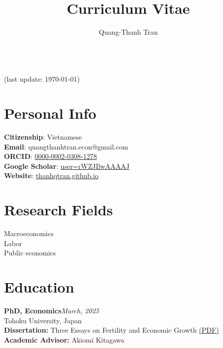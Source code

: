 \documentclass[12pt]{article}
\newcommand{\cvcolor}{\color{DodgerBlue4}} %
\renewcommand{\maketitle}{
\begin{center}
{\Huge\theauthor}\\
{\color{Gray}(last update: \today)}
\end{center}
}
\begin{document}
\title{Curriculum Vitae} %
\author{Quang-Thanh Tran}

\maketitle


\section{Personal Info}
\textbf{Citizenship}: Vietnamese \\
\textbf{Email}: quangthanhtran.econ@gmail.com \\
\textbf{ORCID}: \href{https://orcid.org/0000-0002-0308-1278}{0000-0002-0308-1278}\\
\textbf{Google Scholar}: \href{https://scholar.google.com/citations?user=rWZJIlwAAAAJ&hl=en}{user=rWZJIlwAAAAJ}\\
\textbf{Website}: \href{https://thanhqtran.github.io}{thanhqtran.github.io} \\


\section{Research Fields}
Macroeconomics \\
Labor \\
Public economics


\section{Education}

\textbf{PhD, Economics}\hfill\emph{March, 2025}\\
Tohoku University, Japan \\
\textbf{Dissertation:} Three Essays on Fertility and Economic Growth \href{https://tohoku.repo.nii.ac.jp/record/2003894/files/250325-TRAN-221-1.pdf}{(PDF)}\\
\textbf{Academic Advisor:} Akiomi Kitagawa
\end{document}
